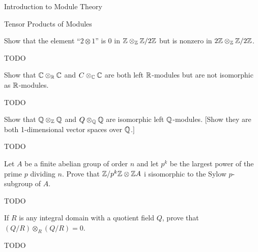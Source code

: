 \begin{chapter}{Introduction to Module Theory}
\begin{section}{Tensor Products of Modules}
\begin{solution}
\end{solution}\oneperpage



\begin{problem}\label{ex:10.4.2}
Show that the element ``$2\otimes 1$'' is $0$ in $\mathbb{Z}\otimes_{\mathbb{Z}} \mathbb{Z}/2\mathbb{Z}$ but is nonzero in $2\mathbb{Z}\otimes_{\mathbb{Z}} \mathbb{Z}/2\mathbb{Z}$. 
\end{problem}
\begin{solution}TODO

\end{solution}\oneperpage



\begin{problem}\label{ex:10.4.3}
Show that $\mathbb{C}\otimes_{\mathbb{R}}\mathbb{C}$ and $C\otimes _{\mathbb{C}}\mathbb{C}$ are both left $\mathbb{R}$-modules but are not isomorphic as $\mathbb{R}$-modules.
\end{problem}
\begin{solution}TODO

\end{solution}\oneperpage



\begin{problem}\label{ex:10.4.4}
Show that $\mathbb{Q}\otimes_{\mathbb{Z}}\mathbb{Q}$ and $Q\otimes_{\mathbb{Q}}\mathbb{Q}$ are isomorphic left $\mathbb{Q}$-modules. [Show they are both 1-dimensional vector spaces over $\mathbb{Q}$.]
\end{problem}
\begin{solution}TODO

\end{solution}\oneperpage



\begin{problem}\label{ex:10.4.5}
Let $A$ be a finite abelian group of order $n$ and let $p^k$ be the largest power of the prime $p$ dividing $n$. Prove that $\mathbb{Z}/p^k\mathbb{Z}\otimes \mathbb{Z} A$ i sisomorphic to the Sylow $p$-subgroup of $A$. 
\end{problem}
\begin{solution}TODO

\end{solution}\oneperpage



\begin{problem}\label{ex:10.4.6}
If $R$ is any integral domain with a quotient field $Q$, prove that $(Q/R)\otimes_R(Q/R) = 0$.
\end{problem}
\begin{solution}TODO

\end{solution}\oneperpage




\end{section}
\end{chapter}
